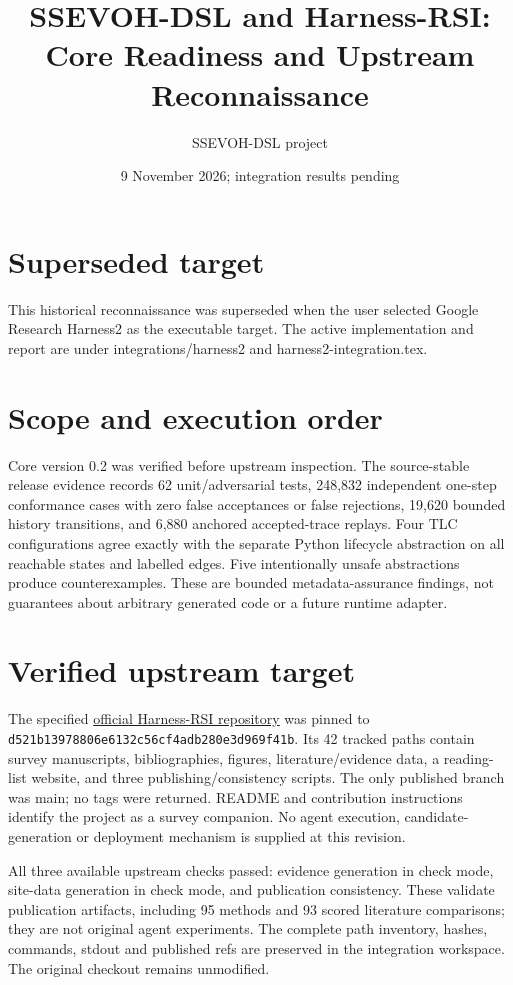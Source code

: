 \documentclass[11pt]{article}
\title{SSEVOH-DSL and Harness-RSI: Core Readiness and Upstream Reconnaissance}
\author{SSEVOH-DSL project}
\date{9 November 2026; integration results pending}
\begin{document}
\maketitle
\section{Superseded target}
This historical reconnaissance was superseded when the user selected Google Research Harness2 as the executable target. The active implementation and report are under integrations/harness2 and harness2-integration.tex.

\section{Scope and execution order}
Core version 0.2 was verified before upstream inspection. The source-stable release evidence records 62 unit/adversarial tests, 248,832 independent one-step conformance cases with zero false acceptances or false rejections, 19,620 bounded history transitions, and 6,880 anchored accepted-trace replays. Four TLC configurations agree exactly with the separate Python lifecycle abstraction on all reachable states and labelled edges. Five intentionally unsafe abstractions produce counterexamples. These are bounded metadata-assurance findings, not guarantees about arbitrary generated code or a future runtime adapter.

\section{Verified upstream target}
The specified \href{https://github.com/zgcagi/Harness-RSI/tree/d521b13978806e6132c56cf4adb280e3d969f41b}{official Harness-RSI repository} was pinned to \texttt{d521b13978806e6132c56cf4adb280e3d969f41b}. Its 42 tracked paths contain survey manuscripts, bibliographies, figures, literature/evidence data, a reading-list website, and three publishing/consistency scripts. The only published branch was main; no tags were returned. README and contribution instructions identify the project as a survey companion. No agent execution, candidate-generation or deployment mechanism is supplied at this revision.

All three available upstream checks passed: evidence generation in check mode, site-data generation in check mode, and publication consistency. These validate publication artifacts, including 95 methods and 93 scored literature comparisons; they are not original agent experiments. The complete path inventory, hashes, commands, stdout and published refs are preserved in the integration workspace. The original checkout remains unmodified.
\end{document}
